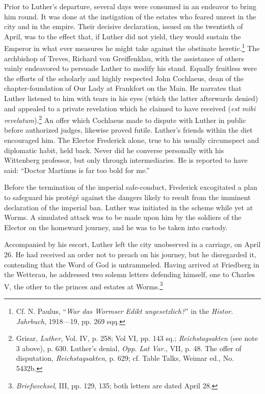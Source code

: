 Prior to Luther’s departure, several days were consumed in an
endeavor to bring him round. It was done at the instigation of the
estates who feared unrest in the city and in the empire. Their decisive
declaration, issued on the twentieth of April, was to the effect that,
if Luther did not yield, they would sustain the Emperor in what
ever measures he might take against the obstinate heretic.\footnote
{Cf. N. Paulus, “\textit{War das Wormser Edikt ungesetzlich?}” in the \textit{Histor. Jahrbuch},
1918—19, pp. 269 sqq.}
The archbishop of Treves, Richard von Greiffenklau, with the assistance
of others vainly endeavored to persuade Luther to modify his stand.
Equally fruitless were the efforts of the scholarly and highly respected
John Cochlaeus, dean of the chapter-foundation of Our Lady at
Frankfort on the Main. He narrates that Luther listened to him
with tears in his eyes (which the latter afterwards denied) and
appealed to a private revelation which he claimed to have received
(\textit{est mibi revelatum}).\footnote
{Grisar, \textit{Luther}, Vol. IV, p. 258; Vol VI, pp. 143 sq.; \textit{Reichstagsakten} (see note 3
above), p. 630. Luther’s denial, \textit{Opp. Lat Var.}, VII, p. 48. The offer of disputation, \textit{Reichstagsakten},
p. 629; cf. Table Talks, Weimar ed., No. 5432b.}
An offer which Cochlaeus made to dispute
with Luther in public before authorized judges, likewise proved
futile. Luther’s friends within the diet encouraged him. The Elector
Frederick alone, true to his usually circumspect and diplomatic habit,
held back. Never did he converse personally with his Wittenberg
professor, but only through intermediaries. He is reported to have
said: “Doctor Martinus is far too bold for me.”

Before the termination of the imperial safe-conduct, Frederick
excogitated a plan to safeguard his protégé against the dangers likely
to result from the imminent declaration of the imperial ban. Luther
was initiated in the scheme while yet at Worms. A simulated attack
was to be made upon him by the soldiers of the Elector on the homeward
journey, and he was to be taken into custody.

Accompanied by his escort, Luther left the city unobserved in
a carriage, on April 26. He had received an order not to preach on
his journey, but he disregarded it, contending that the Word of
God is untrammeled. Having arrived at Friedberg in the Wetterau,
he addressed two solemn letters defending himself, one to Charles
V, the other to the princes and estates at Worms.\footnote{\textit{Briefwechsel}, III, pp. 129, 135; both letters are dated April 28.}

